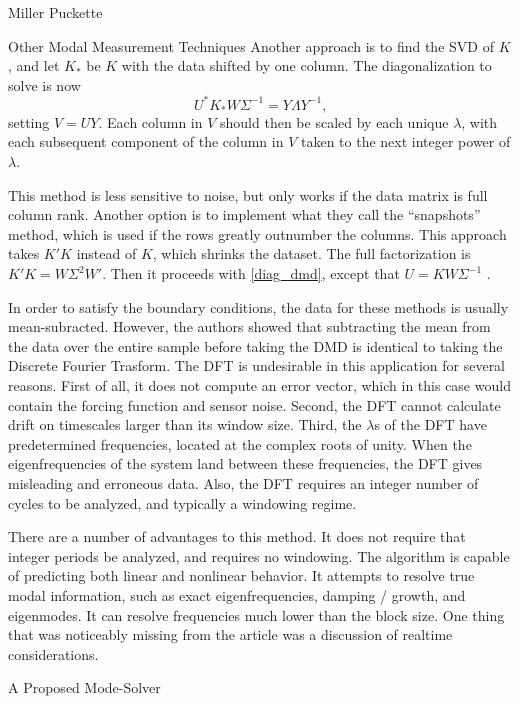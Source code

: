 \documentclass[a4paper,10pt]{report}
\numberwithin{equation}{section}
\begin{document}
\begin{chapter}{Miller Puckette}
\begin{section}{Other Modal Measurement Techniques}
Another approach is to find the SVD of $K$, and let $K_{*}$ be $K$ with the data shifted by one column. The diagonalization to solve is now
\begin{equation}\label{diag_dmd}
U^*K_{*}W\Sigma^{-1} = Y\Lambda Y^{-1}\text{,}
\end{equation}
setting $V = UY$. Each column in $V$ should then be scaled by each unique $\lambda$, with each subsequent component of the column in $V$ taken to the next integer power of $\lambda$. \cite{Chen2012}

This method is less sensitive to noise, but only works if the data matrix is full column rank. Another option is to implement what they call the ``snapshots'' method, which is used if the rows greatly outnumber the columns. This approach takes $K'K$ instead of $K$, which shrinks the dataset. The full factorization is $K'K = W\Sigma^2W'$. Then it proceeds with \eqref{diag_dmd}, except that $U = KW\Sigma^{-1}$ .\cite{Chen2012}

In order to satisfy the boundary conditions, the data for these methods is usually mean-subracted. However, the authors showed that subtracting the mean from the data over the entire sample before taking the DMD is identical to taking the Discrete Fourier Trasform. The DFT is undesirable in this application for several reasons. First of all, it does not compute an error vector, which in this case would contain the forcing function and sensor noise. Second, the DFT cannot calculate drift on timescales larger than its window size. Third, the $\lambda$s of the DFT have predetermined frequencies, located at the complex roots of unity. When the eigenfrequencies of the system land between these frequencies, the DFT gives misleading and erroneous data. Also, the DFT requires an integer number of cycles to be analyzed, and typically a windowing regime. \cite{Chen2012}

There are a number of advantages to this method. It does not require that integer periods be analyzed, and requires no windowing. The algorithm is capable of predicting both linear and nonlinear behavior. It attempts to resolve true modal information, such as exact eigenfrequencies, damping / growth, and eigenmodes. It can resolve frequencies much lower than the block size. One thing that was noticeably missing from the article was a discussion of realtime considerations. \cite{Chen2012}
\end{section}
\begin{section}{A Proposed Mode-Solver}\label{sec:modesolver}


\end{section}
\end{chapter}
\end{document}
